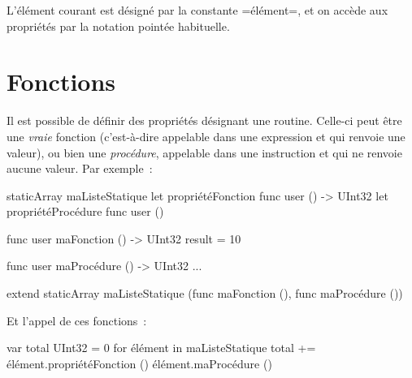L'élément courant est désigné par la constante \plm=élément=, et on accède aux propriétés par la notation pointée habituelle. 








\section{Fonctions}

Il est possible de définir des propriétés désignant une routine. Celle-ci peut être une \emph{vraie} fonction (c'est-à-dire appelable dans une expression et qui renvoie une valeur), ou bien une \emph{procédure}, appelable dans une instruction et qui ne renvoie aucune valeur. Par exemple~:

\begin{PLM}
staticArray maListeStatique {
  let propriétéFonction func user () -> UInt32
  let propriétéProcédure func user ()
}

func user maFonction () -> UInt32 {
  result = 10
}

func user maProcédure () -> UInt32 {
  ...
}

extend staticArray maListeStatique (func maFonction (), func maProcédure ())

\end{PLM}

Et l'appel de ces fonctions~:
\begin{PLM}
var total UInt32 = 0
for élément in maListeStatique {
  total += élément.propriétéFonction ()
  élément.maProcédure ()
}
\end{PLM}



